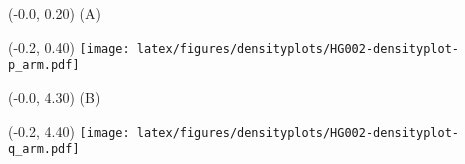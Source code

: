 \documentclass{article}
\begin{document}
\begin{textblock}{13}(-0.0,  0.20) \LARGE{(A)} \end{textblock}
\begin{textblock}{13}(-0.2,  0.40) \texttt{[image: latex/figures/densityplots/HG002-densityplot-p\_arm.pdf]}   \end{textblock}

\begin{textblock}{13}(-0.0,  4.30) \LARGE{(B)} \end{textblock}
\begin{textblock}{13}(-0.2,  4.40) \texttt{[image: latex/figures/densityplots/HG002-densityplot-q\_arm.pdf]}   \end{textblock}
\end{document}
